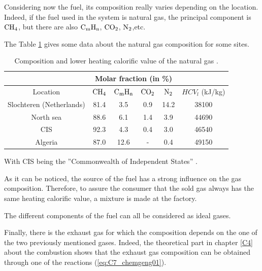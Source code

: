 Considering now the fuel, its composition really varies depending on the location. Indeed, if the fuel used in the system is natural gas, the principal component is $\ce{CH4}$, but there are also $\ce{C}_\text{m}\ce{H}_\text{n}$, $\ce{CO2}$, $\ce{N2}$,etc.

The Table \ref{tab:C7_compgas} gives some data about the natural gas composition for some sites.

\begin{longtable}[c]{cccccc}
\caption{Composition and lower heating calorific value of the natural gas \cite{Leonard2018}.}
\label{tab:C7_compgas}\\
\hline
\textbf{\textbf{}}       & \multicolumn{4}{c}{\textbf{Molar fraction (in \%)}}                    &                 \\ \hline
\endfirsthead
%
\endhead
%
\hline
\endfoot
%
\endlastfoot
%
Location                 & $\ce{CH4}$ & $\ce{C}_\text{m}\ce{H}_\text{n}$ & $\ce{CO2}$ & $\ce{N2}$ & $HCV_l$ (kJ/kg) \\
Slochteren (Netherlands) & 81.4       & 3.5                              & 0.9        & 14.2      & 38100           \\
North sea                & 88.6       & 6.1                              & 1.4        & 3.9       & 44690           \\
CIS                      & 92.3       & 4.3                              & 0.4        & 3.0       & 46540           \\
Algeria                  & 87.0       & 12.6                             & -          & 0.4       & 49150           \\ \hline
\end{longtable}
With CIS being the ''Commonwealth of Independent States'' \cite{EncyclopaediaBritannica2018}.

As it can be noticed, the source of the fuel has a strong influence on the gas composition. Therefore, to assure the consumer that the sold gas always has the same heating calorific value, a mixture is made at the factory. 

The different components of the fuel can all be considered as ideal gases. 

Finally, there is the exhaust gas for which the composition depends on the one of the two previously mentioned gases. Indeed, the theoretical part in chapter \ref{C4} about the combustion shows that the exhaust gas composition can be obtained through one of the reactions (\ref{eq:C7_chemgeng01}).

